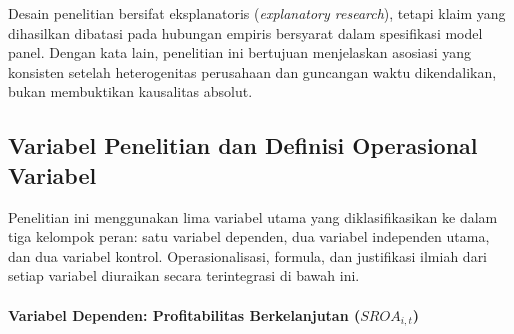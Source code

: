 \documentclass[12pt,a4paper]{article}
\begin{document}
Desain penelitian bersifat eksplanatoris (\emph{explanatory research}),
tetapi klaim yang dihasilkan dibatasi pada hubungan empiris bersyarat
dalam spesifikasi model panel. Dengan kata lain, penelitian ini
bertujuan menjelaskan asosiasi yang konsisten setelah heterogenitas
perusahaan dan guncangan waktu dikendalikan, bukan membuktikan
kausalitas absolut.

\subsection{Variabel Penelitian dan Definisi Operasional
Variabel}\label{variabel-penelitian-dan-definisi-operasional-variabel}

Penelitian ini menggunakan lima variabel utama yang diklasifikasikan ke
dalam tiga kelompok peran: satu variabel dependen, dua variabel
independen utama, dan dua variabel kontrol. Operasionalisasi, formula,
dan justifikasi ilmiah dari setiap variabel diuraikan secara
terintegrasi di bawah ini.

\paragraph{\texorpdfstring{Variabel Dependen: Profitabilitas
Berkelanjutan
(\(SROA_{i,t}\))}{Variabel Dependen: Profitabilitas Berkelanjutan (SROA\_\{i,t\})}}\label{variabel-dependen-profitabilitas-berkelanjutan-sroa_it}
\end{document}
